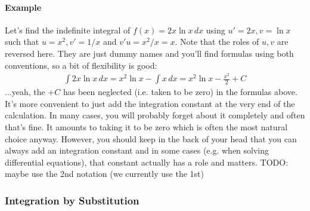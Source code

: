 

\paragraph{Example} Let's find the indefinite integral of $f(x) = 2 x \ln x \, dx$ using $u' = 2 x, v = \ln x$ such that $u = x^2, v' = 1/x$ and $v' u = x^2/x = x$. Note that the roles of $u,v$ are reversed here. They are just dummy names and you'll find formulas using both conventions, so a bit of flexibility is good:
\begin{align}
  \int 2 x \ln x \, dx = x^2 \ln x - \int x \, dx = x^2 \ln x - \frac{x^2}{2} + C
\end{align}
...yeah, the $+ C$ has been neglected (i.e. taken to be zero) in the formulas above. It's more convenient to just add the integration constant at the very end of the calculation. In many cases, you will probably forget about it completely and often that's fine. It amounts to taking it to be zero which is often the most natural choice anyway. However, you should keep in the back of your head that you can always add an integration constant and in some cases (e.g. when solving differential equations), that constant actually has a role and matters.
TODO: maybe use the 2nd notation (we currently use the 1st)






\subsubsection{Integration by Substitution} 



